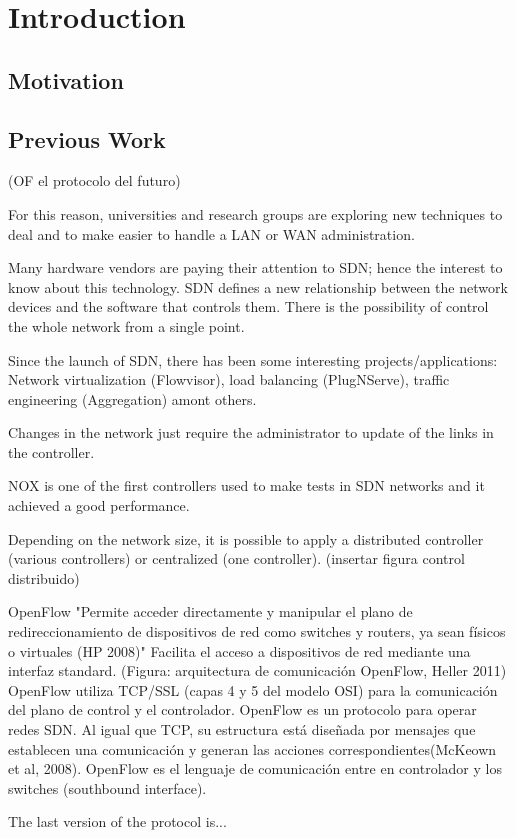 \chapter{Introduction}\label{ch:introduction}

\bigskip
\section{Motivation}
\bigskip
\section{Previous Work}
\bigskip

(OF el protocolo del futuro){
For this reason, universities and research groups are exploring new techniques to deal and to make easier to handle a LAN or WAN administration.

Many hardware vendors are paying their attention to \ac{SDN}; hence the interest to know about this technology.
SDN defines a new relationship between the network devices  and the software that controls them.
There is the possibility of control the whole network from a single point.

Since the launch of SDN, there has been some interesting projects/applications: Network virtualization (Flowvisor), load balancing (PlugNServe), traffic engineering (Aggregation) amont others.

Changes in the network just require the administrator to update of the links in the controller.

NOX is one of the first controllers used to make tests in SDN networks and it achieved a good performance.

Depending on the network size, it is possible to apply a distributed controller (various controllers) or centralized (one controller). (insertar figura control distribuido)

OpenFlow "Permite acceder directamente y manipular el plano de redireccionamiento de dispositivos de red como switches y routers, ya sean físicos o virtuales (HP 2008)"
Facilita el acceso a dispositivos de red mediante una interfaz standard. (Figura: arquitectura de comunicación OpenFlow, Heller 2011)
OpenFlow utiliza TCP/SSL (capas 4 y 5 del modelo OSI) para la comunicación del plano de control y el controlador.
OpenFlow es un protocolo para operar redes SDN. Al igual que TCP, su estructura está diseñada por mensajes que establecen una comunicación y generan las acciones correspondientes(McKeown et al, 2008).
OpenFlow es el lenguaje de comunicación entre en controlador y los switches (southbound interface).

The last version of the protocol is...
}

